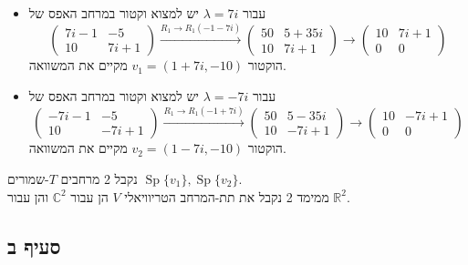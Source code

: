 \documentclass{article}
\def\reals{\mathbb{R}}
\def\complex{\mathbb{C}}
\DeclareMathOperator{\Sp}{Sp}
\begin{document}
\begin{itemize}
    \item עבור $\lambda=7i$ יש למצוא וקטור במרחב האפס של \[
              \begin{pmatrix}
                  7i-1 & -5   \\
                  10   & 7i+1
              \end{pmatrix} \xrightarrow[]{R_1\rightarrow R_1 (-1-7i)}
              \begin{pmatrix}
                  50 & 5+35i \\
                  10 & 7i+1
              \end{pmatrix}\rightarrow
              \begin{pmatrix}
                  10 & 7i+1 \\
                  0  & 0
              \end{pmatrix}
          \]
          הוקטור $v_1=(1+7i, -10)$ מקיים את המשוואה.
    \item עבור $\lambda=-7i$ יש למצוא וקטור במרחב האפס של \[
              \begin{pmatrix}
                  -7i-1 & -5    \\
                  10    & -7i+1
              \end{pmatrix} \xrightarrow[]{R_1\rightarrow R_1 (-1+7i)}
              \begin{pmatrix}
                  50 & 5-35i \\
                  10 & -7i+1
              \end{pmatrix}\rightarrow
              \begin{pmatrix}
                  10 & -7i+1 \\
                  0  & 0
              \end{pmatrix}
          \]
          הוקטור $v_2=(1-7i, -10)$ מקיים את המשוואה.
\end{itemize}
נקבל 2 מרחבים $T$-שמורים $\Sp\{v_1\}, \Sp\{ v_2 \}$. \\
ממימד 2 נקבל את תת-המרחב הטריוויאלי $V$ הן עבור $\complex^2$ והן עבור $\reals^2$.

\subsection*{סעיף ב}
\end{document}
